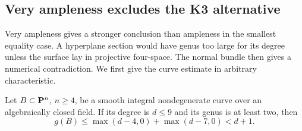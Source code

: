 \subsection{Very ampleness excludes the K3 alternative}

Very ampleness gives a stronger conclusion than ampleness in the
smallest equality case. A hyperplane section would have genus too
large for its degree unless the surface lay in projective
four-space. The normal bundle then gives a numerical contradiction.
We first give the curve estimate in arbitrary characteristic.

\begin{lemma}\label{lem:small-degree-curve-bound}
Let $B\subset\mathbf P^n$, $n\geq4$, be a smooth integral nondegenerate
curve over an algebraically closed field. If its degree is
$d\leq9$ and its genus is at least two, then
\[
 g(B)\leq\max(d-4,0)+\max(d-7,0)<d+1.
\]
\end{lemma}


